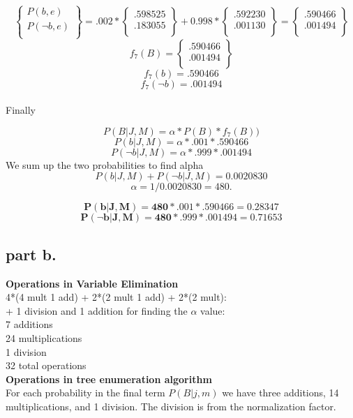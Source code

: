 \[
\begin{Bmatrix} P(b,e) \\ P(\neg b, e) \\ \end{Bmatrix} =
.002 * \begin{Bmatrix} .598525 \\ .183055 \\\end{Bmatrix} + 0.998 * \begin{Bmatrix}.592230 \\ .001130 \\ \end{Bmatrix} =
\begin{Bmatrix} .590466 \\ .001494 \\ \end{Bmatrix}
\]
\[
f_7(B) = \begin{Bmatrix} .590466 \\ .001494 \\ \end{Bmatrix}
\]
\[
f_7(b) = .590466
\]
\[
f_7(\neg b) = .001494
\]
\\
Finally

\[
P(B|J,M) = \alpha * P(B) * f_7(B) )
\]
\[
P(b|J,M) = \alpha * .001 * .590466
\]
\[
P(\neg b|J,M) = \alpha * .999 * .001494
\]
We sum up the two probabilities to find alpha
\[
{P(b|J,M) + P(\neg b | J,M) = 0.0020830}
\]
\[
\alpha = 1 / 0.0020830 = 480.
\]

\[
\bm{
P(b|J,M) = 480 * .001 * .590466 = 0.28347
}
\]
\[
\bm{
P(\neg b|J,M) = 480 * .999 * .001494 = 0.71653
}
\]


\subsection{part b.}
\textbf{Operations in Variable Elimination} \\
4*(4 mult 1 add) +  2*(2 mult 1 add) + 2*(2 mult): \\
+ 1 division and 1 addition for finding the $\alpha$ value: \\
7 additions \\
24 multiplications \\
1 division \\
32 total operations \\

\textbf{Operations in tree enumeration algorithm} \\
For each probability in the final term $P(B|j,m)$ we have three additions, 14 multiplications, and 1 division. The division is from the normalization factor.

